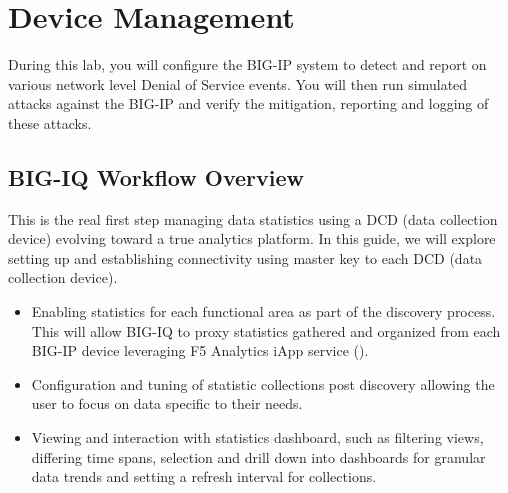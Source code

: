 \documentclass[letterpaper,10pt,english]{sphinxmanual}
\begin{document}
\section{Device Management}
\label{\detokenize{class1/module4/module4:device-management}}\label{\detokenize{class1/module4/module4::doc}}
During this lab, you will configure the BIG-IP system to detect and
report on various network level Denial of Service events. You will then
run simulated attacks against the BIG-IP and verify the mitigation,
reporting and logging of these attacks.


\subsection{BIG-IQ Workflow Overview}
\label{\detokenize{class1/module4/lab1:big-iq-workflow-overview}}\label{\detokenize{class1/module4/lab1::doc}}

This is the real first step managing data statistics using a DCD (data
collection device) evolving toward a true analytics platform. In this
guide, we will explore setting up and establishing connectivity using
master key to each DCD (data collection device).
\begin{itemize}
\item {} 
Enabling statistics for each functional area as part of the discovery
process. This will allow BIG-IQ to proxy statistics gathered and
organized from each BIG-IP device leveraging F5 Analytics iApp
service
().

\item {} 
Configuration and tuning of statistic collections post discovery
allowing the user to focus on data specific to their needs.

\item {} 
Viewing and interaction with statistics dashboard, such as filtering
views, differing time spans, selection and drill down into dashboards
for granular data trends and setting a refresh interval for
collections.

\end{itemize}

\end{document}
